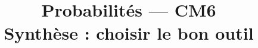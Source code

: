 
\usepackage{tikz}
\usepackage{needspace}

\newcommand{\atrou}[2][3cm]{%
  \ifthenelse{\boolean{showSolutions}}{%
    \par\vspace{0.5em}%
    \begin{mdframed}[backgroundcolor=ThemeLight, linewidth=0pt,
      skipabove=0pt, skipbelow=0pt,
      innertopmargin=8pt, innerbottommargin=8pt]%
    #2%
    \end{mdframed}%
    \par\vspace{0.5em}%
  }{%
    \par\vspace{0.5em}%
    \noindent\fbox{\begin{minipage}[c][#1]%
      {\dimexpr\textwidth-2\fboxsep-2\fboxrule\relax}%
      \color{white}\rule{0pt}{0pt}%
    \end{minipage}}%
    \par\vspace{0.5em}%
  }%
}

\newcommand{\val}[1]{%
  \ifthenelse{\boolean{showSolutions}}{#1}{\phantom{#1}}%
}

\newcommand{\R}{\mathbb{R}}
\newcommand{\E}{\mathbb{E}}
\newcommand{\Var}{\operatorname{Var}}
\newcommand{\Xbar}{\overline{X}_n}

\title{\sffamily\bfseries Probabilités --- CM6\\[0.3em]
  \Large Synthèse : choisir le bon outil}
\author{}
\date{}


\sffamily
\maketitle
\thispagestyle{empty}

\bigskip

